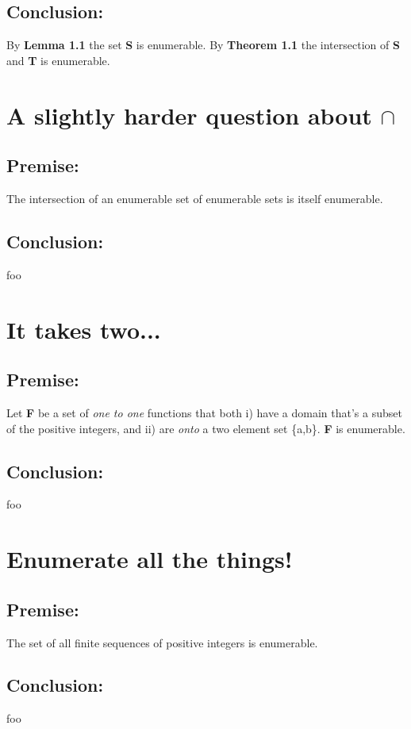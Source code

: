 \documentclass[a4paper,11pt]{article}
\begin{document}
	\subsection*{Conclusion:}
	By \textbf{Lemma 1.1} the set \textbf{S} is enumerable.  By \textbf{Theorem 1.1} the intersection
	of \textbf{S} and \textbf{T} is enumerable.
		
\pagebreak


\section{A slightly harder question about $\cap$}

	\subsection*{Premise:}
	The intersection of an enumerable set of enumerable sets is itself enumerable.

	\subsection*{Conclusion:}
	foo


\section{It takes two...}

	\subsection*{Premise:}
	Let \textbf{F} be a set of \textit{one to one} functions that both i) have a domain that's a subset of the positive
	integers, and ii) are \textit{onto} a two element set \{a,b\}. \textbf{F} is enumerable.

	\subsection*{Conclusion:}
	foo


\section{Enumerate all the things!}

	\subsection*{Premise:}
	The set of all finite sequences of positive integers is enumerable.

	\subsection*{Conclusion:}
	foo
\end{document}

